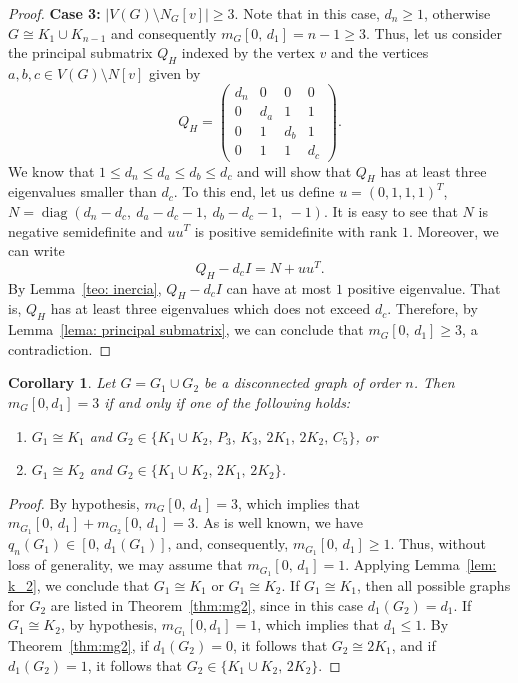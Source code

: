 \documentclass[preprint,12pt]{elsarticle}
\newtheorem{theorem}{Theorem}[section]
\newtheorem{corollary}[theorem]{Corollary}
\begin{document}
\begin{proof}
\textbf{Case 3:} \( |V(G) \setminus N_G[v]| \geq 3 \). Note that in this case, $d_n \geq 1$, otherwise $G \cong K_1 \cup K_{n-1}$ and consequently $m_G[0,\,d_1] = n - 1 \geq 3$. 
Thus, let us consider the principal submatrix $Q_H$ indexed by the vertex $v$ and the vertices $a, b, c \in V(G) \setminus N[v]$ given by
\[
Q_H = \begin{pmatrix}
d_n & 0 & 0 & 0 \\[4pt]
0 & d_a & 1 & 1 \\[4pt]
0 & 1 & d_b & 1 \\[4pt]
0 & 1 & 1 & d_c
\end{pmatrix}.
\]
We know that $1 \leq d_n \leq d_a \leq d_b \leq d_c$ and will show that $Q_H$ has at least three eigenvalues smaller than $d_c$. To this end, let us define \(u = (0, 1, 1, 1)^T\), $N = \operatorname{diag}(d_n - d_c,\ d_a - d_c - 1,\ d_b - d_c - 1,\ -1)$. It is easy to see that $N$ is negative semidefinite and $uu^T$ is positive semidefinite with rank $1$. Moreover, we can write
\[
Q_H - d_cI = N + u u^T.
\]
By Lemma~\ref{teo: inercia}, \(Q_H - d_c I\) can have at most $1$ positive eigenvalue. That is, $Q_H$ has at least three eigenvalues which does not exceed $d_c$. Therefore, by Lemma~\ref{lema: principal submatrix}, we can conclude that $m_G[0,\,d_1] \geq 3$, a contradiction. 
\end{proof}


\begin{corollary}
Let $G = G_1 \cup G_2$ be a disconnected graph of order $n$. Then \( m_G [0, d_{1}] = 3 \) if and only if one of the following holds: 
\begin{enumerate}[label=\roman*)]
\item $G_1 \cong K_1$ and $G_2 \in \{K_1 \cup K_2,\, P_3,\, K_3,\, 2K_1,\, 2K_2,\, C_5\}$, or 
\item $G_1 \cong K_2$ and $G_2 \in \{K_1 \cup K_2,\, 2K_1,\, 2K_2\}$. 
\end{enumerate}
\end{corollary}
\begin{proof}
By hypothesis, $m_G[0,\,d_1] = 3$, which implies that $m_{G_1}[0,\, d_1] + m_{G_2}[0,\, d_1] = 3$. As is well known, we have $ q_n(G_1) \in [0,\, d_1(G_1)]$, and, consequently, $ m_{G_1}[0,\, d_1] \geq 1$. Thus, without loss of generality, we may assume that $m_{G_1}[0,\, d_1] = 1$. Applying Lemma~\ref{lem: k_2}, we conclude that $G_1 \cong K_1$ or $G_1 \cong K_2$. If \(G_1 \cong K_1\), then all possible graphs for \(G_2\) are listed in Theorem~\ref{thm:mg2}, since in this case \(d_1(G_2) = d_1\). If \(G_1 \cong K_2\), by hypothesis, \(m_{G_1}[0, d_1] = 1\), which implies that \(d_1 \leq 1\). By Theorem~\ref{thm:mg2}, if \(d_1(G_2) = 0\), it follows that \(G_2 \cong 2K_1\), and if \(d_1(G_2) = 1\), it follows that
$G_2 \in \{ K_1 \cup K_2,\, 2K_2 \}$.
\end{proof}
\end{document}
